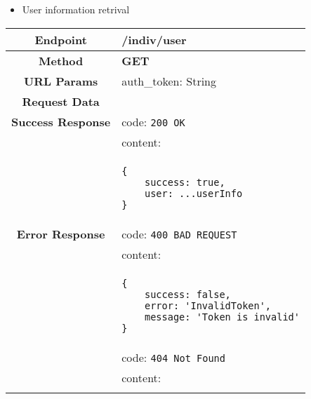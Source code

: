     \begin{itemize}
        \item User information retrival
    \end{itemize}
    \begin{adjustwidth}{1cm}{}
        \begin{longtable}{|c|l|}
            \hline
            \textbf{Endpoint} & /indiv/user \\
            \hline
            \textbf{Method} & \textbf{GET} \\
            \hline
            \textbf{URL Params} &  auth\_token: String \\
            \hline
            \textbf{Request Data} &  \\
            \hline
            \textbf{Success Response} & code: \texttt{200 OK} \\
            &                           content: \\
            & \begin{minipage}[t]{0.5\textwidth}
                \begin{adjustwidth}{1.5cm}{}
                \begin{verbatim}
{
    success: true, 
    user: ...userInfo
}
                \end{verbatim}
                \end{adjustwidth}
              \end{minipage} \\
              \hline
            \textbf{Error Response} & code: \texttt{400 BAD REQUEST} \\
            &                         content: \\
            & \begin{minipage}[t]{0.7\textwidth}
                \begin{adjustwidth}{1.5cm}{}
                \begin{verbatim}
{
    success: false, 
    error: 'InvalidToken',
    message: 'Token is invalid'
}
                \end{verbatim}
                \end{adjustwidth}
              \end{minipage} \\
              \hline
              & code: \texttt{404 Not Found} \\
            &                         content: \\
            & \begin{minipage}[t]{0.7\textwidth}

\end{minipage}
\end{longtable}
\end{adjustwidth}
